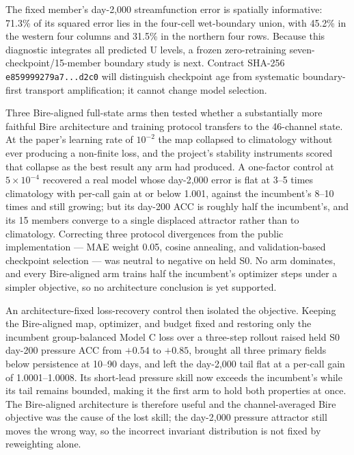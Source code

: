 \documentclass[11pt]{article}
\begin{document}
The fixed member's day-2,000 streamfunction error is spatially informative:
71.3\% of its squared error lies in the four-cell wet-boundary union, with
45.2\% in the western four columns and 31.5\% in the northern four rows.
Because this diagnostic integrates all predicted U levels, a frozen
zero-retraining seven-checkpoint/15-member boundary study is next.  Contract
SHA-256 \texttt{e859999279a7\allowbreak...\allowbreak d2c0} will distinguish
checkpoint age from systematic boundary-first transport amplification; it
cannot change model selection.

Three Bire-aligned full-state arms then tested whether a substantially more
faithful Bire architecture and training protocol transfers to the 46-channel
state.  At the paper's learning rate of \(10^{-2}\) the map collapsed to
climatology without ever producing a non-finite loss, and the project's
stability instruments scored that collapse as the best result any arm had
produced.  A one-factor control at \(5\times10^{-4}\) recovered a real model
whose day-2,000 error is flat at 3--5 times climatology with per-call gain at or
below 1.001, against the incumbent's 8--10 times and still growing; but its
day-200 ACC is roughly half the incumbent's, and its 15 members converge to a
single displaced attractor rather than to climatology.  Correcting three
protocol divergences from the public implementation --- MAE weight 0.05, cosine
annealing, and validation-based checkpoint selection --- was neutral to negative
on held S0.  No arm dominates, and every Bire-aligned arm trains half the
incumbent's optimizer steps under a simpler objective, so no architecture
conclusion is yet supported.

An architecture-fixed loss-recovery control then isolated the objective.  Keeping
the Bire-aligned map, optimizer, and budget fixed and restoring only the
incumbent group-balanced Model C loss over a three-step rollout raised held S0
day-200 pressure ACC from \(+0.54\) to \(+0.85\), brought all three primary
fields below persistence at 10--90 days, and left the day-2,000 tail flat at a
per-call gain of 1.0001--1.0008.  Its short-lead pressure skill now exceeds the
incumbent's while its tail remains bounded, making it the first arm to hold both
properties at once.  The Bire-aligned architecture is therefore useful and the
channel-averaged Bire objective was the cause of the lost skill; the day-2,000
pressure attractor still moves the wrong way, so the incorrect invariant
distribution is not fixed by reweighting alone.
\end{document}
